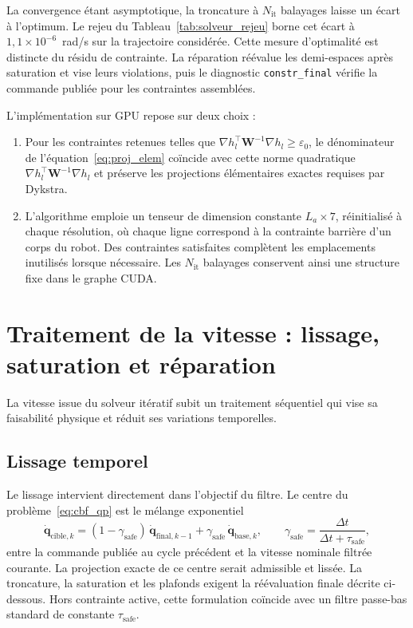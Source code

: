La convergence étant asymptotique, la troncature à $N_{\mathrm{it}}$ balayages laisse un écart à l'optimum. Le rejeu du Tableau~\ref{tab:solveur_rejeu} borne cet écart à $1{,}1\times10^{-6}$~rad/s sur la trajectoire considérée. Cette mesure d'optimalité est distincte du résidu de contrainte. La réparation réévalue les demi-espaces après saturation et vise leurs violations, puis le diagnostic \texttt{constr\_final} vérifie la commande publiée pour les contraintes assemblées.

L'implémentation sur \ac{GPU} repose sur deux choix :
\begin{enumerate}
  \item Pour les contraintes retenues telles que $\nabla h_l^\top\mathbf{W}^{-1}\nabla h_l \geq \varepsilon_0$, le dénominateur de l'équation~\eqref{eq:proj_elem} coïncide avec cette norme quadratique $\nabla h_l^\top\mathbf{W}^{-1}\nabla h_l$ et préserve les projections élémentaires exactes requises par Dykstra.
  \item L'algorithme emploie un tenseur de dimension constante $L_a \times 7$, réinitialisé à chaque résolution, où chaque ligne correspond à la contrainte barrière d'un corps du robot. Des contraintes satisfaites complètent les emplacements inutilisés lorsque nécessaire. Les $N_{\mathrm{it}}$ balayages conservent ainsi une structure fixe dans le graphe \ac{CUDA}.
\end{enumerate}

\section*{Traitement de la vitesse : lissage, saturation et réparation}

La vitesse issue du solveur itératif subit un traitement séquentiel qui vise sa faisabilité physique et réduit ses variations temporelles.

\subsection*{Lissage temporel}

Le lissage intervient directement dans l'objectif du filtre. Le centre du problème~\eqref{eq:cbf_qp} est le mélange exponentiel
\begin{equation}
\dot{\mathbf{q}}_{\mathrm{cible},k}
=
(1-\gamma_{\mathrm{safe}})\,
\dot{\mathbf{q}}_{\mathrm{final},k-1}
+
\gamma_{\mathrm{safe}}\,
\dot{\mathbf{q}}_{\mathrm{base},k},
\qquad
\gamma_{\mathrm{safe}}
=
\frac{\Delta t}{\Delta t+\tau_{\mathrm{safe}}},
\end{equation}
entre la commande publiée au cycle précédent et la vitesse nominale filtrée courante. La projection exacte de ce centre serait admissible et lissée. La troncature, la saturation et les plafonds exigent la réévaluation finale décrite ci-dessous. Hors contrainte active, cette formulation coïncide avec un filtre passe-bas standard de constante $\tau_{\mathrm{safe}}$.


